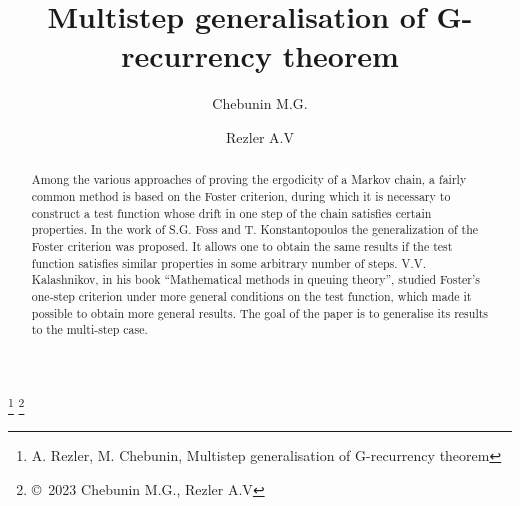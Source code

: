 	\begin{frontmatter}
		
		
		
		\dochead{}
		
		\title{Multistep generalisation of G-recurrency theorem}
		
		
		\author[l1]{Chebunin M.G.}%
		\author[l2]{Rezler A.V}
		
		\address[l1]{Karlsruhe Institute of Technology, Institute of Stochastics, Karlsruhe, 76131, Germany.}%
		
		\address[l2]{Novosibirsk State University, 2, Pirogova str.}%
		
		\thanks{\sc A. Rezler, M. Chebunin,
			Multistep generalisation of G-recurrency theorem}
		\thanks{\copyright \ 2023 Chebunin M.G., Rezler A.V}
		
		\begin{abstract}
			Among the various approaches of proving the ergodicity of a Markov chain, a fairly common method is based on the Foster criterion, during which it is necessary to construct a test function whose drift in one step of the chain satisfies certain properties. In the work of S.G. Foss and T. Konstantopoulos the generalization of the Foster criterion was proposed. It allows one to obtain the same results if the test function satisfies similar properties in some arbitrary number of steps. V.V. Kalashnikov, in his book “Mathematical methods in queuing theory”, studied Foster’s one-step criterion under more general conditions on the test function, which made it possible to obtain more general results. The goal of the paper is to generalise its results to the multi-step case.
		\end{abstract}
		

\end{frontmatter}
